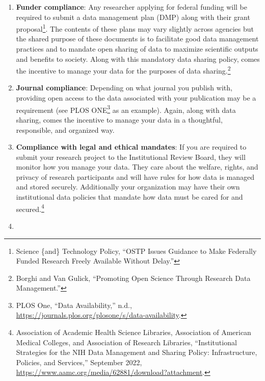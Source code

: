 \documentclass[
]{book}
\begin{document}
\begin{enumerate}
\def\labelenumi{\arabic{enumi}.}
\item
  \textbf{Funder compliance}: Any researcher applying for federal funding will be required to submit a data management plan (DMP) along with their grant proposal\footnote{Science \{and\} Technology Policy, {``{OSTP} Issues Guidance to Make Federally Funded Research Freely Available Without Delay.''}}. The contents of these plans may vary slightly across agencies but the shared purpose of these documents is to facilitate good data management practices and to mandate open sharing of data to maximize scientific outputs and benefits to society. Along with this mandatory data sharing policy, comes the incentive to manage your data for the purposes of data sharing.\footnote{Borghi and Van Gulick, {``Promoting Open Science Through Research Data Management.''}}
\item
  \textbf{Journal compliance}: Depending on what journal you publish with, providing open access to the data associated with your publication may be a requirement (see PLOS ONE\footnote{PLOS One, {``Data Availability,''} n.d., \url{https://journals.plos.org/plosone/s/data-availability}.} as an example). Again, along with data sharing, comes the incentive to manage your data in a thoughtful, responsible, and organized way.
\item
  \textbf{Compliance with legal and ethical mandates}: If you are required to submit your research project to the Institutional Review Board, they will monitor how you manage your data. They care about the welfare, rights, and privacy of research participants and will have rules for how data is managed and stored securely. Additionally your organization may have their own institutional data policies that mandate how data must be cared for and secured.\footnote{Association of Academic Health Science Libraries, Association of American Medical Colleges, and Association of Research Libraries, {``Institutional Strategies for the {NIH} Data Management and Sharing Policy: Infrastructure, Policies, and Services,''} September 2022, \url{https://www.aamc.org/media/62881/download?attachment}.}
\item

\end{enumerate}
\end{document}
